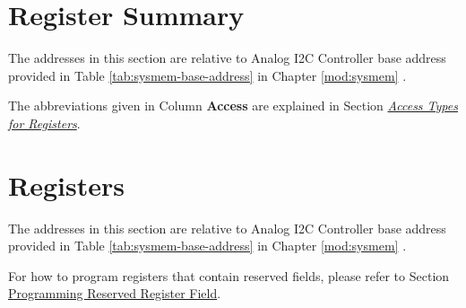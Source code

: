 \documentclass[main\_\_EN.tex]{subfiles}
\def \modulefiles {./46-ANAI2C}
\begin{document}



\newpage
\hypertarget{anai2c-reg-summ}{}
\section{Register Summary}
\label{sec:anai2c-reg-summ}

The addresses in this section are relative to Analog I2C Controller base address provided in Table \ref{tab:sysmem-base-address} in Chapter \ref{mod:sysmem} \textit{}.

The abbreviations given in Column \textbf{Access} are explained in Section \hyperref[glossary-access-types]{\textit{Access Types for Registers}}.






\newpage
\section{Registers}

The addresses in this section are relative to Analog I2C Controller base address provided in Table \ref{tab:sysmem-base-address} in Chapter \ref{mod:sysmem} \textit{}.

For how to program registers that contain reserved fields, please refer to Section \hyperref[programming-reserved-field]{Programming Reserved Register Field}.


\end{document}
